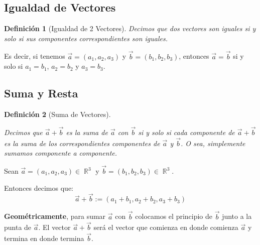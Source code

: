\documentclass[12pt, fleqn]{report}                             %
\newtheorem{Definition}{Definición}[section]                    %
\DeclareMathOperator \Reals        {\mathbb{R}}                 %
\begin{document}
            \subsection{Igualdad de Vectores}

                \begin{Definition}[Igualdad de 2 Vectores]
                    \label{DefIgualdadVectores}
                    Decimos que dos vectores son iguales si y solo si sus componentes
                    correspondientes son iguales.
                \end{Definition}

                Es decir, si tenemos $\vec{a} = (a_1, a_2, a_3)$ y $\vec{b} = (b_1, b_2, b_3)$,
                entonces $\vec{a} = \vec{b}$ si y solo si $a_1 = b_1$, $a_2 = b_2$ y $a_3 = b_3$.

            
            \subsection{Suma y Resta}
            
                \begin{Definition}[Suma de Vectores]
                    \label{DefSumaVectores}

                    Decimos que $\vec{a}+\vec{b}$ es la suma de $\vec{a}$ con $\vec{b}$ si y solo si 
                    cada componente de $\vec{a}+\vec{b}$ es la suma de los correspondientes componentes
                    de $\vec{a}$ y $\vec{b}$.
                    O sea, simplemente sumamos componente a componente.

                \end{Definition}

                Sean $\vec{a} = (a_1, a_2, a_3) \in \Reals^3$ y $\vec{b}=(b_1, b_2, b_3) \in \Reals^3$.

                Entonces decimos que:
                \begin{equation*}
                    \vec{a} + \vec{b} := (a_1 + b_1, a_2 + b_2, a_3 + b_3)
                \end{equation*}
            
                \textbf{Geométricamente}, para sumar $\vec{a}$ con $\vec{b}$ colocamos el principio de
                $\vec{b}$ junto a la punta de $\vec{a}$. El vector $\vec{a} + \vec{b}$ será el vector
                que comienza en donde comienza $\vec{a}$ y termina en donde termina $\vec{b}$.
                
\end{document}
